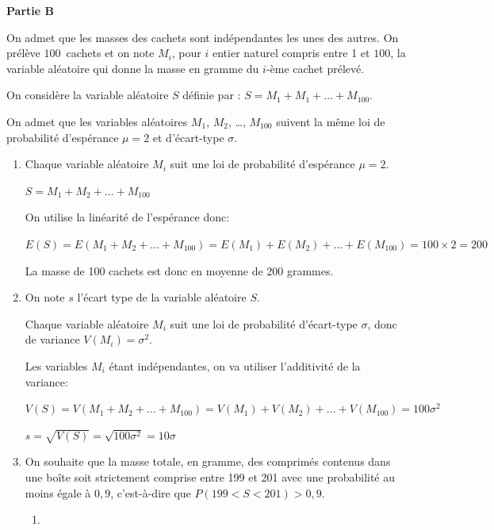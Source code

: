 \documentclass[10pt]{article}
\providecommand{\ds}{\displaystyle}
\begin{document}
\begin{center}
	\textbf{Partie B}
\end{center}

On admet que les masses des cachets sont indépendantes les unes des autres. On prélève 
$100$~cachets et on note $M_i$, pour $i$ entier naturel compris entre 1 et $100$, la variable aléatoire qui donne la masse en gramme du $i$-ème cachet prélevé.



On considère la variable aléatoire $S$ définie par :
$ S= M_1+ M_1+ \ldots+ M_{100}.$

On admet que les variables aléatoires $M_1$,\: $M_2$,\: \ldots,\: $M_{100}$ suivent la même loi de probabilité d'espérance $\mu = 2$ et d'écart-type $\sigma$.

\begin{enumerate}
	\item Chaque variable aléatoire $M_i$ suit une loi de probabilité d'espérance $\mu=2$.
	
$ S= M_1+ M_2+ \ldots+ M_{100}$

On utilise la linéarité de l'espérance donc:

$E(S) = E \left (M_1+ M_2+ \ldots+ M_{100} \right )
= E \left (M_1\right ) + E\left (M_2\right) + \ldots+ E\left (M_{100} \right)
= 100 \times 2 = 200$
	


La masse de 100 cachets est donc en moyenne de 200 grammes.

	\item On note $s$ l'écart type de la variable aléatoire $S$.
	
Chaque variable aléatoire $M_i$ suit une loi de probabilité d'écart-type $\sigma$, donc de variance $V\left (M_i\right ) = \sigma^2$.
	
Les variables $M_i$ étant indépendantes, on va utiliser l'additivité de la variance:

$V(S) = V \left (M_1+ M_2+ \ldots+ M_{100} \right )
= V \left (M_1\right ) + V\left (M_2\right )+ \ldots+ V\left (M_{100} \right )
= 100 \sigma^2$

$s = \ds\sqrt{V(S)} = \ds\sqrt{100 \sigma^2}=10\sigma$


	\item On souhaite que la masse totale, en gramme, des comprimés contenus dans une boîte soit strictement comprise entre 199 et 201 avec une probabilité au moins égale à $0,9$, c'est-à-dire que $P(199<S<201) > 0,9$.
	\begin{enumerate}
		\item 


\end{enumerate}
\end{enumerate}
\end{document}
